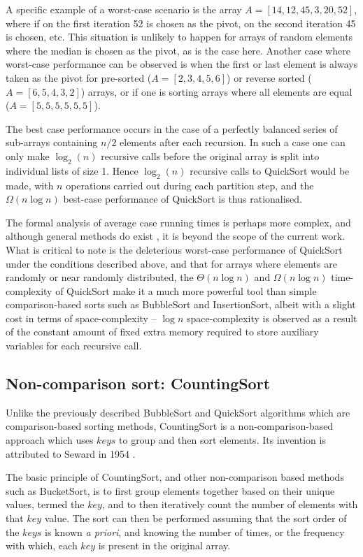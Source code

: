 \documentclass[12pt,a4paper]{article}
\begin{document}
A specific example of a worst-case scenario is the array $A = [14,12,45,3,20,52]$, where if on the first iteration 52 is chosen as the pivot, on the second iteration 45 is chosen, etc. This situation is unlikely to happen for arrays of random elements where the median is chosen as the pivot, as is the case here. Another case where worst-case performance can be observed is when the first or last element is always taken as the pivot for pre-sorted ($A = [2,3,4,5,6]$) or reverse sorted ($A = [6,5,4,3,2]$) arrays, or if one is sorting arrays where all elements are equal ($A = [5,5,5,5,5,5]$).

The best case performance occurs in the case of a perfectly balanced series of sub-arrays containing $n/2$ elements after each recursion. In such a case  one can only make $\log _2(n)$ recursive calls before the original array is split into individual lists of size 1. Hence $\log _2(n)$ recursive calls to QuickSort would be made, with $n$ operations carried out during each partition step, and the $\Omega(n\log n)$ best-case performance of QuickSort is thus rationalised. 

The formal analysis of average case running times is perhaps more complex, and although general methods do exist \cite{bentley_general_1980}, it is beyond the scope of the current work. What is critical to note is the deleterious worst-case performance of QuickSort under the conditions described above, and that for arrays where elements are randomly or near randomly distributed, the  $\Theta(n\log n)$ and $\Omega(n\log n)$ time-complexity of QuickSort make it a much more powerful tool than simple comparison-based sorts such as BubbleSort and InsertionSort, albeit with a slight cost in terms of space-complexity -- $\log n$ space-complexity is observed as a result of the constant amount of fixed extra memory required to store auxiliary variables for each recursive call.


\subsection{Non-comparison sort: CountingSort}
Unlike the previously described BubbleSort and QuickSort algorithms which are comparison-based sorting methods, CountingSort is a non-comparison-based approach which uses $keys$ to group and then sort elements. Its invention is attributed to Seward in 1954 \cite{seward1954information}. 

The basic principle of CountingSort, and other non-comparison based methods such as BucketSort, is to first group elements together based on their unique values, termed the $key$, and to then iteratively count the number of elements with that $key$ value. The sort can then be performed assuming that the sort order of the $keys$ is known \emph{a priori}, and knowing the number of times, or the frequency with which, each $key$ is present in the original array. 
\end{document}
